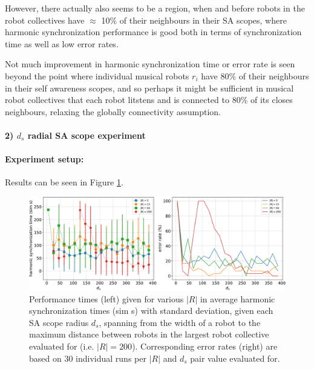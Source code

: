 				However, there actually also seems to be a region, when and before robots in the robot collectives have $\approx$ 10\% of their neighbours in their SA scopes, where harmonic synchronization performance is good both in terms of synchronization time as well as low error rates.
				
				Not much improvement in harmonic synchronization time or error rate is seen beyond the point where individual musical robots $r_i$ have 80\% of their neighbours in their self awareness scopes, and so perhaps it might be sufficient in musical robot collectives that each robot litstens and is connected to 80\% of its closes neighbours, relaxing the globally connectivity assumption.
				
			
			\paragraph{2) $d_s$ radial SA scope experiment}
				
				\paragraph{Experiment setup:\nl}
				
				Results can be seen in Figure \ref{fig:phase_and_freq_sync_d_s_SA_scope_tuning}.
				
				\begin{figure}[ht!]
					\centering
					\includegraphics[width=\linewidth]{Assets/DocSegments/Chapters/ExperimentsAndResults/Figures/PerfScores/phase_and_freq_sync_d_s_SA_scope_tuning_experiment_performance.pdf}
					\caption[Experiment results for $\phi$ \& $\omega$ synchronization $d_s$ SA scope tuning experiment.]{Performance times (left) given for various $|R|$ in average harmonic synchronization times (sim s) with standard deviation, given each SA scope radius $d_s$, spanning from the width of a robot to the maximum distance between robots in the largest robot collective evaluated for (i.e. $|R|=200$). Corresponding error rates (right) are based on 30 individual runs per $|R|$ and $d_s$ pair value evaluated for.}
					\label{fig:phase_and_freq_sync_d_s_SA_scope_tuning}
				\end{figure}
				
